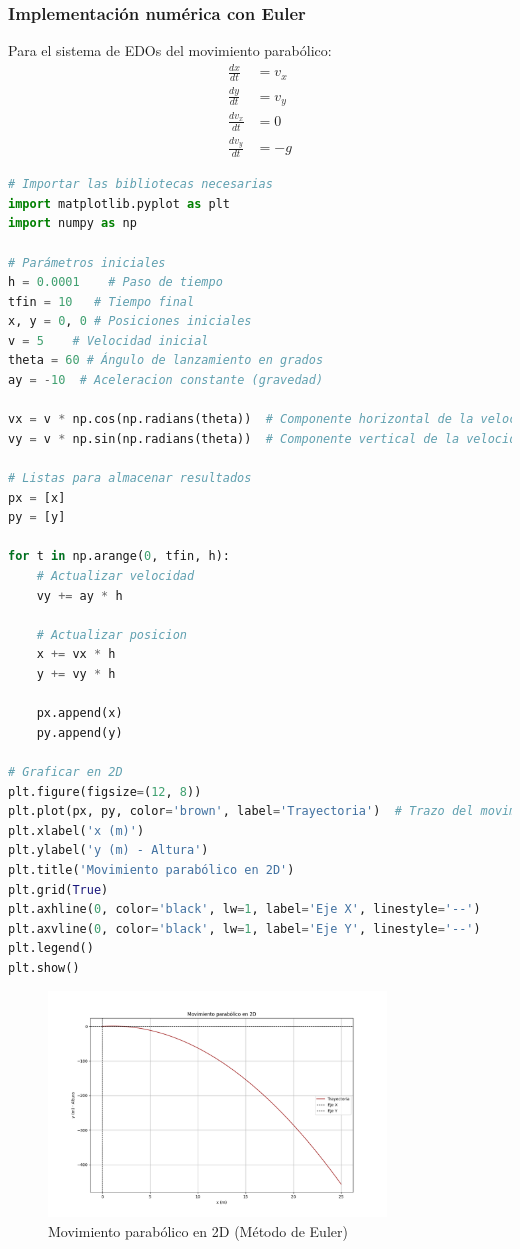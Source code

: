 \documentclass{article}
\begin{document}
\begin{center}
	\subsubsection{Implementación numérica con Euler}
	
	Para el sistema de EDOs del movimiento parabólico:
	\begin{align}
		\frac{dx}{dt} &= v_x \\
		\frac{dy}{dt} &= v_y \\
		\frac{dv_x}{dt} &= 0 \\
		\frac{dv_y}{dt} &= -g
	\end{align}
	
	\begin{lstlisting}[language=Python, caption={Método de Euler para movimiento parabólico con análisis de error}]
# Importar las bibliotecas necesarias
import matplotlib.pyplot as plt
import numpy as np

# Parámetros iniciales
h = 0.0001    # Paso de tiempo
tfin = 10   # Tiempo final
x, y = 0, 0 # Posiciones iniciales
v = 5    # Velocidad inicial
theta = 60 # Ángulo de lanzamiento en grados
ay = -10  # Aceleracion constante (gravedad)

vx = v * np.cos(np.radians(theta))  # Componente horizontal de la velocidad
vy = v * np.sin(np.radians(theta))  # Componente vertical de la velocidad

# Listas para almacenar resultados
px = [x]
py = [y]

for t in np.arange(0, tfin, h):
    # Actualizar velocidad
    vy += ay * h

    # Actualizar posicion
    x += vx * h
    y += vy * h

    px.append(x)
    py.append(y)

# Graficar en 2D
plt.figure(figsize=(12, 8))
plt.plot(px, py, color='brown', label='Trayectoria')  # Trazo del movimiento
plt.xlabel('x (m)')
plt.ylabel('y (m) - Altura')
plt.title('Movimiento parabólico en 2D')
plt.grid(True)
plt.axhline(0, color='black', lw=1, label='Eje X', linestyle='--')
plt.axvline(0, color='black', lw=1, label='Eje Y', linestyle='--')
plt.legend()
plt.show()

	\end{lstlisting}

    \begin{figure}[H]
    \centering
    \includegraphics[width=0.8\textwidth]{img/2-2.png}
    \caption{Movimiento parabólico en 2D (Método de Euler)}
    \label{fig:salida_consola}
\end{figure}


\end{center}
\end{document}
